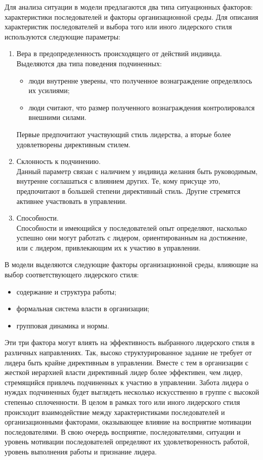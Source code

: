 \documentclass[a4paper,12pt,oneside,final]{extarticle}
\numberwithin{equation}{section}
\begin{document}
Для анализа ситуации в модели предлагаются два типа ситуационных факторов: характеристики последователей и факторы организационной среды. 
Для описания характеристик последователей и выбора того или иного лидерского стиля используются следующие параметры:
\begin{enumerate}
	\item Вера в предопределенность происходящего от действий индивида. \\
	Выделяются два типа поведения подчиненных:
	\begin{itemize}
		\item люди внутренне уверены, что полученное вознаграждение определялось их усилиями;
		\item люди считают, что размер полученного вознаграждения контролировался внешними силами.
	\end{itemize}
	Первые предпочитают участвующий стиль лидерства, а вторые более удовлетворены директивным стилем.
	\item Склонность к подчинению. \\
	Данный параметр связан с наличием у индивида желания быть руководимым, внутренне соглашаться с влиянием других. 
	Те, кому присуще это, предпочитают в большей степени директивный стиль. 
	Другие стремятся активнее участвовать в управлении.
	\item Способности. \\ 
	Способности и имеющийся у последователей опыт определяют, насколько успешно они могут работать с лидером, ориентированным на достижение, или с лидером, привлекающим их к участию в управлении.
\end{enumerate}

В модели выделяются следующие факторы организационной среды, влияющие на выбор соответствующего лидерского стиля:
\begin{itemize}
	\item содержание и структура работы;
	\item формальная система власти в организации;
	\item групповая динамика и нормы.
\end{itemize}

Эти три фактора могут влиять на эффективность выбранного лидерского стиля в различных направлениях. 
Так, высоко структурированное задание не требует от лидера быть крайне директивным в управлении. 
Вместе с тем в организации с жесткой иерархией власти директивный лидер более эффективен, чем лидер, стремящийся привлечь подчиненных к участию в управлении. 
Забота лидера о нуждах подчиненных будет выглядеть несколько искусственно в группе с высокой степенью сплоченности. 
В целом в рамках того или иного лидерского стиля происходит взаимодействие между характеристиками последователей и организационными факторами, оказывающее влияние на восприятие мотивации последователями. 
В свою очередь восприятие, последователями, ситуации и уровень мотивации последователей определяют их удовлетворенность работой, уровень выполнения работы и признание лидера.
\end{document}
